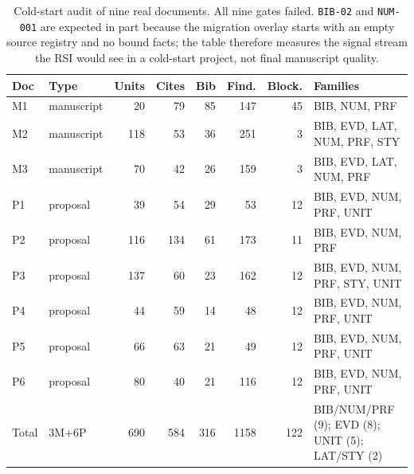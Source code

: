 \begin{table}[t]
\centering
\scriptsize
\caption{Cold-start audit of nine real documents. All nine gates failed. \texttt{BIB-02} and \texttt{NUM-001} are expected in part because the migration overlay starts with an empty source registry and no bound facts; the table therefore measures the signal stream the RSI would see in a cold-start project, not final manuscript quality.}
\label{tab:corpus-experiments}
\begin{tabularx}{\linewidth}{@{}l l r r r r r >{\raggedright\arraybackslash}X@{}}
\toprule
Doc & Type & Units & Cites & Bib & Find. & Block. & Families \\
\midrule
M1 & manuscript & 20 & 79 & 85 & 147 & 45 & BIB, NUM, PRF \\
M2 & manuscript & 118 & 53 & 36 & 251 & 3 & BIB, EVD, LAT, NUM, PRF, STY \\
M3 & manuscript & 70 & 42 & 26 & 159 & 3 & BIB, EVD, LAT, NUM, PRF \\
P1 & proposal & 39 & 54 & 29 & 53 & 12 & BIB, EVD, NUM, PRF, UNIT \\
P2 & proposal & 116 & 134 & 61 & 173 & 11 & BIB, EVD, NUM, PRF \\
P3 & proposal & 137 & 60 & 23 & 162 & 12 & BIB, EVD, NUM, PRF, STY, UNIT \\
P4 & proposal & 44 & 59 & 14 & 48 & 12 & BIB, EVD, NUM, PRF, UNIT \\
P5 & proposal & 66 & 63 & 21 & 49 & 12 & BIB, EVD, NUM, PRF, UNIT \\
P6 & proposal & 80 & 40 & 21 & 116 & 12 & BIB, EVD, NUM, PRF, UNIT \\
\midrule
Total & 3M+6P & 690 & 584 & 316 & 1158 & 122 & BIB/NUM/PRF (9); EVD (8); UNIT (5); LAT/STY (2) \\
\bottomrule
\end{tabularx}
\end{table}
